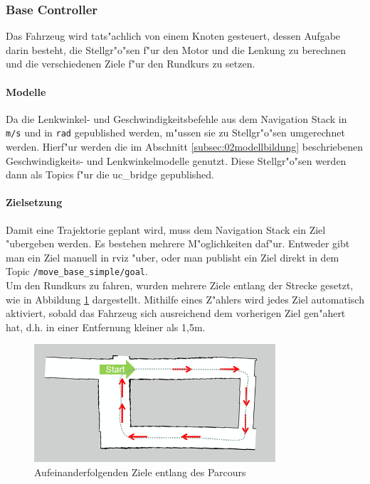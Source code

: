 \subsubsection{Base Controller}
\label{subsubsec:02psesTrajectory}

Das Fahrzeug wird tats"achlich von einem Knoten gesteuert, dessen Aufgabe darin besteht, die Stellgr"o"sen f"ur den Motor und die Lenkung zu berechnen und die verschiedenen Ziele f"ur den Rundkurs zu setzen.

\paragraph{Modelle}
Da die Lenkwinkel- und Geschwindigkeitsbefehle aus dem Navigation Stack in \texttt{m/s} und in \texttt{rad} gepublished werden, m"ussen sie zu Stellgr"o"sen umgerechnet werden. Hierf"ur werden die im Abschnitt \ref{subsec:02modellbildung} beschriebenen Geschwindigkeits- und Lenkwinkelmodelle genutzt. Diese Stellgr"o"sen werden dann als Topics f"ur die uc\_bridge gepublished.

\paragraph{Zielsetzung}
Damit eine Trajektorie geplant wird, muss dem Navigation Stack ein Ziel "ubergeben werden. Es bestehen mehrere M"oglichkeiten daf"ur. Entweder gibt man ein Ziel manuell in rviz "uber, oder man publisht ein Ziel direkt in dem Topic \texttt{/move\_base\_simple/goal}.\\
Um den Rundkurs zu fahren, wurden mehrere Ziele entlang der Strecke gesetzt, wie in Abbildung \ref{fig:goals} dargestellt. Mithilfe eines Z"ahlers wird jedes Ziel automatisch aktiviert, sobald das Fahrzeug sich ausreichend dem vorherigen Ziel gen"ahert hat, d.h. in einer Entfernung kleiner als 1,5m.

\begin{figure}[H]
	\centering
	\includegraphics[width=0.8\textwidth,trim=2.4cm 0cm 0cm 1cm,clip]{pics/goals.png}
	\caption{Aufeinanderfolgenden Ziele entlang des Parcours}
	\label{fig:goals}
\end{figure}

